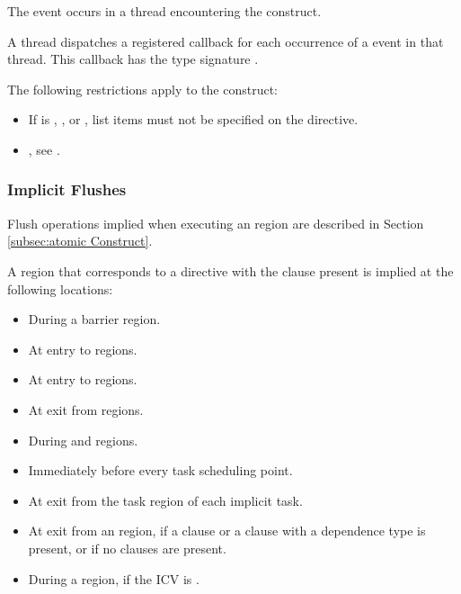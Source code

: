 \events

The  event occurs in a thread encountering the
 construct.

\tools

A thread dispatches a registered  callback
for each occurrence of a  event in that thread. This
callback has the type signature .

\restrictions

The following restrictions apply to the  construct:

\begin{itemize}
\item If  is , , or
    , list items must not be specified on the  directive.
\end{itemize}

\crossreferences
\begin{itemize}
\item {}, see
.
\end{itemize}

\subsubsection{Implicit Flushes}
\label{subsec:implicit flushes}

Flush operations implied when executing an  region are described in
Section \ref{subsec:atomic Construct}.

A  region that corresponds to a  directive with the
 clause present is implied at the following locations:

\begin{itemize}
\item During a barrier region.
\item At entry to  regions.
\item At entry to  regions.
\item At exit from  regions.
\item During  and 
    regions.
\item Immediately before every task scheduling point.
\item At exit from the task region of each implicit task.
\item At exit from an  region, if a
     clause or a  clause with a
     dependence type is present, or if no clauses are present.
\item During a  region, if the  ICV is
    .
\end{itemize}


